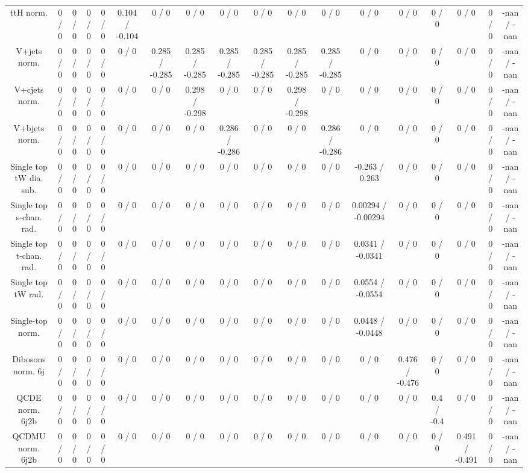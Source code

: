 \documentclass[10pt]{article}
\begin{document}
\begin{table}[htbp]
\begin{center}
\begin{tabular}{|c|c|c|c|c|c|c|c|c|c|c|c|c|c|c|c|c|c|}
  ttH norm. & 0 / 0 & 0 / 0 & 0 / 0 & 0 / 0 & 0.104 / -0.104 & 0 / 0 & 0 / 0 & 0 / 0 & 0 / 0 & 0 / 0 & 0 / 0 & 0 / 0 & 0 / 0 & 0 / 0 & 0 / 0 & 0 / 0 & -nan / -nan \\ 
  V+jets norm. & 0 / 0 & 0 / 0 & 0 / 0 & 0 / 0 & 0 / 0 & 0.285 / -0.285 & 0.285 / -0.285 & 0.285 / -0.285 & 0.285 / -0.285 & 0.285 / -0.285 & 0.285 / -0.285 & 0 / 0 & 0 / 0 & 0 / 0 & 0 / 0 & 0 / 0 & -nan / -nan \\ 
  V+cjets norm. & 0 / 0 & 0 / 0 & 0 / 0 & 0 / 0 & 0 / 0 & 0 / 0 & 0.298 / -0.298 & 0 / 0 & 0 / 0 & 0.298 / -0.298 & 0 / 0 & 0 / 0 & 0 / 0 & 0 / 0 & 0 / 0 & 0 / 0 & -nan / -nan \\ 
  V+bjets norm. & 0 / 0 & 0 / 0 & 0 / 0 & 0 / 0 & 0 / 0 & 0 / 0 & 0 / 0 & 0.286 / -0.286 & 0 / 0 & 0 / 0 & 0.286 / -0.286 & 0 / 0 & 0 / 0 & 0 / 0 & 0 / 0 & 0 / 0 & -nan / -nan \\ 
  Single top tW dia. sub. & 0 / 0 & 0 / 0 & 0 / 0 & 0 / 0 & 0 / 0 & 0 / 0 & 0 / 0 & 0 / 0 & 0 / 0 & 0 / 0 & 0 / 0 & -0.263 / 0.263 & 0 / 0 & 0 / 0 & 0 / 0 & 0 / 0 & -nan / -nan \\ 
  Single top s-chan. rad. & 0 / 0 & 0 / 0 & 0 / 0 & 0 / 0 & 0 / 0 & 0 / 0 & 0 / 0 & 0 / 0 & 0 / 0 & 0 / 0 & 0 / 0 & 0.00294 / -0.00294 & 0 / 0 & 0 / 0 & 0 / 0 & 0 / 0 & -nan / -nan \\ 
  Single top t-chan. rad. & 0 / 0 & 0 / 0 & 0 / 0 & 0 / 0 & 0 / 0 & 0 / 0 & 0 / 0 & 0 / 0 & 0 / 0 & 0 / 0 & 0 / 0 & 0.0341 / -0.0341 & 0 / 0 & 0 / 0 & 0 / 0 & 0 / 0 & -nan / -nan \\ 
  Single top tW rad. & 0 / 0 & 0 / 0 & 0 / 0 & 0 / 0 & 0 / 0 & 0 / 0 & 0 / 0 & 0 / 0 & 0 / 0 & 0 / 0 & 0 / 0 & 0.0554 / -0.0554 & 0 / 0 & 0 / 0 & 0 / 0 & 0 / 0 & -nan / -nan \\ 
  Single-top norm. & 0 / 0 & 0 / 0 & 0 / 0 & 0 / 0 & 0 / 0 & 0 / 0 & 0 / 0 & 0 / 0 & 0 / 0 & 0 / 0 & 0 / 0 & 0.0448 / -0.0448 & 0 / 0 & 0 / 0 & 0 / 0 & 0 / 0 & -nan / -nan \\ 
  Dibosons norm. 6j & 0 / 0 & 0 / 0 & 0 / 0 & 0 / 0 & 0 / 0 & 0 / 0 & 0 / 0 & 0 / 0 & 0 / 0 & 0 / 0 & 0 / 0 & 0 / 0 & 0.476 / -0.476 & 0 / 0 & 0 / 0 & 0 / 0 & -nan / -nan \\ 
  QCDE norm. 6j2b & 0 / 0 & 0 / 0 & 0 / 0 & 0 / 0 & 0 / 0 & 0 / 0 & 0 / 0 & 0 / 0 & 0 / 0 & 0 / 0 & 0 / 0 & 0 / 0 & 0 / 0 & 0.4 / -0.4 & 0 / 0 & 0 / 0 & -nan / -nan \\ 
  QCDMU norm. 6j2b & 0 / 0 & 0 / 0 & 0 / 0 & 0 / 0 & 0 / 0 & 0 / 0 & 0 / 0 & 0 / 0 & 0 / 0 & 0 / 0 & 0 / 0 & 0 / 0 & 0 / 0 & 0 / 0 & 0.491 / -0.491 & 0 / 0 & -nan / -nan \\ 

\end{tabular}
\end{center}
\end{table}
\end{document}
